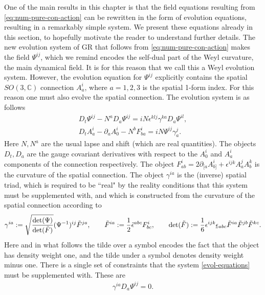 \documentclass[10pt]{report}
\newcommand{\utilde}[1]{\underaccent{\tilde}{#1}}
\theoremstyle{definition}
\newcommand{\C}[0]{\mathbb{C}}
\newcommand{\im}{i}
\begin{document}
One of the main results in this chapter is that the field equations resulting from \cref{eq:num-pure-con-action} can be rewritten in the form of evolution equations, resulting in a remarkably simple system. We present these equations already in this section, to hopefully motivate the reader to understand further details. The new evolution system of GR that follows from \cref{eq:num-pure-con-action} makes the field $\Psi^{ij}$, which we remind encodes the self-dual part of the Weyl curvature, the main dynamical field. It is for this reason that we call this a Weyl evolution system. However, the evolution equation for $\Psi^{ij}$ explicitly contains the spatial $SO(3,\C)$ connection $A^i_a$, where $a=1,2,3$ is the spatial 1-form index. For this reason one must also evolve the spatial connection. The evolution system is as follows
\begin{equation}
\begin{aligned}\label{evol-equations}
D_t \Psi^{ij} - N^a D_a \Psi^{ij} = \im N \epsilon^{klj} \gamma^{ka} D_a \Psi^{il}, \\
D_t A_a^i - \partial_a A_0^i - N^b F^i_{ba} = \im N \Psi^{ij} \gamma^j_a.
\end{aligned}
\end{equation}
Here $N, N^a$ are the usual lapse and shift (which are real quantities). The objects $D_t, D_a$ are the gauge covariant derivatives with respect to the $A_0^i$ and $A_a^i$ components of the connection respectively. The object $F^i_{ab}= 2\partial_{[a} A^i_{b]} + \epsilon^{ijk} A^j_a A^k_b$ is the curvature of the spatial connection. The object $\gamma^{i a}$ is the (inverse) spatial triad, which is required to be ``real" by the reality conditions that this system must be supplemented with, and which is constructed from the curvature of the spatial connection according to
\begin{align}\label{spatial-frame}
\gamma^{ia} := \sqrt{\frac{{\rm det}(\Psi)}{{\rm det}(\tilde{F})}} (\Psi^{-1})^{ij} \tilde{F}^{ja}, \qquad \tilde{F}^{ia}: = \frac{1}{2} \tilde{\epsilon}^{abc} F^i_{bc}, \qquad {\rm det}(\tilde{F}) := \frac{1}{6} \epsilon^{ijk} \utilde{\epsilon}_{abc} \tilde{F}^{ia} \tilde{F}^{jb}\tilde{F}^{kc}.
\end{align}
Here and in what follows the tilde over a symbol encodes the fact that the object has density weight one, and the tilde under a symbol denotes density weight minus one. There is a single set of constraints that the system \cref{evol-equations} must be supplemented with. These are
\begin{align}\label{constr}
\gamma^{ia} D_a \Psi^{ij}=0.
\end{align}
\end{document}
